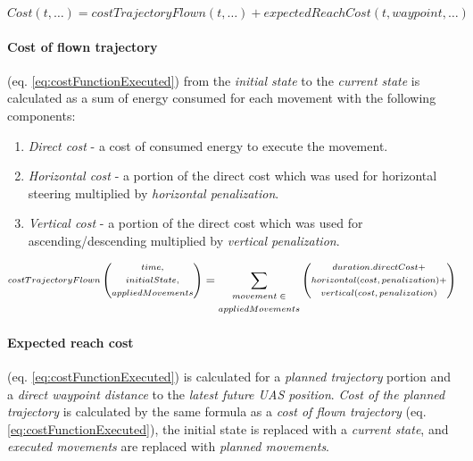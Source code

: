 \begin{equation}\label{eq:consFunctionMeta}
    Cost (t,\dots)= costTrajectoryFlown(t,\dots) + expectedReachCost(t,waypoint,\dots)
\end{equation}


\paragraph{Cost of flown trajectory} (eq. \ref{eq:costFunctionExecuted}) from the \emph{initial state} to the \emph{current state} is calculated as a sum of energy consumed for each movement with the following components:
\begin{enumerate}
    \item \emph{Direct cost} - a cost of consumed energy to execute the movement.
    
    \item \emph{Horizontal cost} - a portion of the direct cost which was used for horizontal steering multiplied by \emph{horizontal penalization}.
    
    \item \emph{Vertical cost} - a portion of the direct cost which was used for ascending/descending multiplied by \emph{vertical penalization}.
\end{enumerate}


\begin{equation}\label{eq:costFunctionExecuted}
   \scriptsize \begin{gathered}costTrajectoryFlown \end{gathered} \left (\begin{gathered}time,\\ initialState,\\ appliedMovements \end{gathered}\right) = \sum_{\begin{gathered}  movement\in\\ appliedMovements\end{gathered}\normalsize} \left(\begin{gathered}
        duration.directCost+\\
        horizontal(cost,penalization)+\\
        vertical(cost,penalization)
   \end{gathered}
   \right) 
   \normalsize
\end{equation}
 
\paragraph{Expected reach cost} (eq. \ref{eq:costFunctionExecuted}) is calculated for a \emph{planned trajectory} portion and a \emph{direct waypoint distance} to the \emph{latest future UAS position}. \emph{Cost of the planned trajectory} is calculated by the same formula as a \emph{cost of flown trajectory} (eq. \ref{eq:costFunctionExecuted}), the initial state is replaced with a  \emph{current state}, and \emph{executed movements} are replaced with \emph{planned movements}.
    
